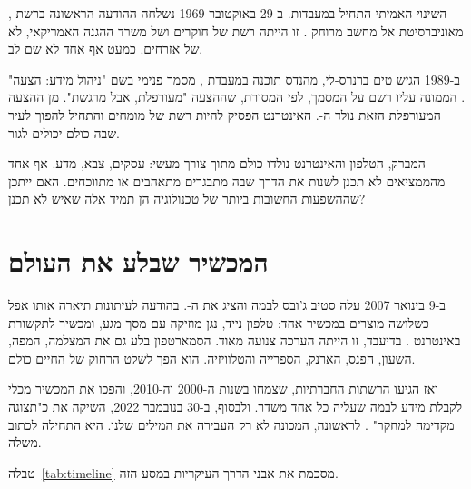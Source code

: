 השינוי האמיתי התחיל במעבדות. ב-29 באוקטובר \num{1969} נשלחה ההודעה הראשונה ברשת , מאוניברסיטת  אל מחשב מרוחק \parencite{kleinrock2019}. זו הייתה רשת של חוקרים ושל משרד ההגנה האמריקאי, לא של אזרחים. כמעט אף אחד לא שם לב.

ב-1989 הגיש טים ברנרס-לי, מהנדס תוכנה במעבדת , מסמך פנימי בשם "ניהול מידע: הצעה" \parencite{berners1989}. הממונה עליו רשם על המסמך, לפי המסורת, שההצעה "מעורפלת, אבל מרגשת". מן ההצעה המעורפלת הזאת נולד ה-. האינטרנט הפסיק להיות רשת של מומחים והתחיל להפוך לעיר שבה כולם יכולים לגור.

\begin{thinkbox}
המברק, הטלפון והאינטרנט נולדו כולם מתוך צורך מעשי: עסקים, צבא, מדע. אף אחד מהממציאים לא תכנן לשנות את הדרך שבה מתבגרים מתאהבים או מתווכחים. האם ייתכן שההשפעות החשובות ביותר של טכנולוגיה הן תמיד אלה שאיש לא תכנן?
\end{thinkbox}

\section{המכשיר שבלע את העולם}

ב-9 בינואר 2007 עלה סטיב ג'ובס לבמה והציג את ה-. בהודעה לעיתונות תיארה אותו אפל כשלושה מוצרים במכשיר אחד: טלפון נייד, נגן מוזיקה עם מסך מגע, ומכשיר לתקשורת באינטרנט \parencite{apple2007}. בדיעבד, זו הייתה הערכה צנועה מאוד. הסמארטפון בלע גם את המצלמה, המפה, השעון, הפנס, הארנק, הספרייה והטלוויזיה. הוא הפך לשלט הרחוק של החיים כולם.

ואז הגיעו הרשתות החברתיות, שצמחו בשנות ה-2000 וה-2010, והפכו את המכשיר מכלי לקבלת מידע לבמה שעליה כל אחד משדר. ולבסוף, ב-30 בנובמבר 2022, השיקה  את  כ"תצוגה מקדימה למחקר" \parencite{openai2022}. לראשונה, המכונה לא רק העבירה את המילים שלנו. היא התחילה לכתוב משלה.

טבלה~\ref{tab:timeline} מסכמת את אבני הדרך העיקריות במסע הזה.

